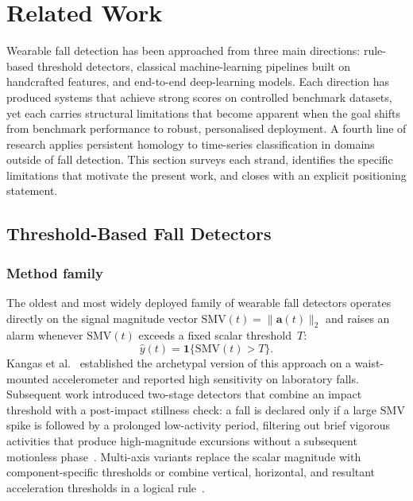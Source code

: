 \chapter{Related Work}
\label{sec:related}

Wearable fall detection has been approached from three main directions: rule-based
threshold detectors, classical machine-learning pipelines built on handcrafted
features, and end-to-end deep-learning models.  Each direction has produced systems
that achieve strong scores on controlled benchmark datasets, yet each carries
structural limitations that become apparent when the goal shifts from benchmark
performance to robust, personalised deployment.  A fourth line of research applies
persistent homology to time-series classification in domains outside of fall detection.
This section surveys each strand, identifies the specific limitations that motivate
the present work, and closes with an explicit positioning statement.

\section{Threshold-Based Fall Detectors}
\label{subsec:rw-threshold}

\subsection{Method family}

The oldest and most widely deployed family of wearable fall detectors operates
directly on the signal magnitude vector
$\mathrm{SMV}(t)=\|\mathbf{a}(t)\|_2$
and raises an alarm whenever $\mathrm{SMV}(t)$ exceeds a fixed scalar threshold~$T$:
\[
  \widehat y(t) = \mathbf{1}\{\mathrm{SMV}(t) > T\}.
\]
Kangas et al.~\parencite{kangas2008fall} established the archetypal version of this
approach on a waist-mounted accelerometer and reported high sensitivity on laboratory
falls.  Subsequent work introduced two-stage detectors that combine an impact
threshold with a post-impact stillness check: a fall is declared only if a large
$\mathrm{SMV}$ spike is followed by a prolonged low-activity period, filtering out
brief vigorous activities that produce high-magnitude excursions without a subsequent
motionless phase~\parencite{igual2013challenges}.  Multi-axis variants replace the scalar
magnitude with component-specific thresholds or combine vertical, horizontal, and
resultant acceleration thresholds in a logical rule~\parencite{delahoz2014survey}.

